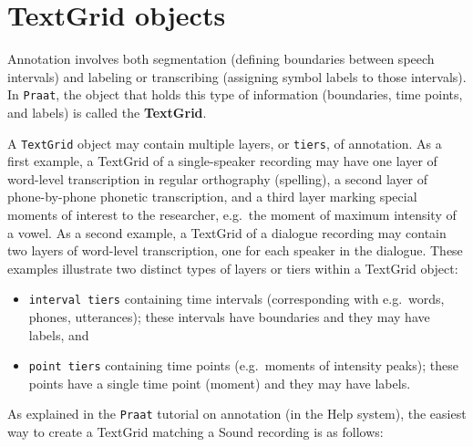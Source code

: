 \documentclass[
]{book}
\begin{document}
\protect{}\label{box-praattextgrid}
\section{TextGrid objects}\label{sec:textgrids}

Annotation involves both segmentation (defining boundaries between speech intervals) and labeling or transcribing (assigning symbol labels to those intervals). In \texttt{Praat}, the object that holds this type of information (boundaries, time points, and labels) is called the \textbf{TextGrid}.

A \texttt{TextGrid} object may contain multiple layers, or \texttt{tiers}, of annotation. As a first example, a TextGrid of a single-speaker recording may have one layer of word-level transcription in regular orthography (spelling), a second layer of phone-by-phone phonetic transcription, and a third layer marking special moments of interest to the researcher, e.g.~the moment of maximum intensity of a vowel. As a second example, a TextGrid of a dialogue recording may contain two layers of word-level transcription, one for each speaker in the dialogue. These examples illustrate two distinct types of layers or tiers within a TextGrid object:

\begin{itemize}
\item
  \texttt{interval\ tiers} containing time intervals (corresponding with e.g.~words, phones, utterances); these intervals have boundaries and they may have labels, and
\item
  \texttt{point\ tiers} containing time points (e.g.~moments of intensity peaks); these points have a single time point (moment) and they may have labels.
\end{itemize}

As explained in the \texttt{Praat} tutorial on annotation (in the Help system), the easiest way to create a TextGrid matching a Sound recording is as follows:
\end{document}
